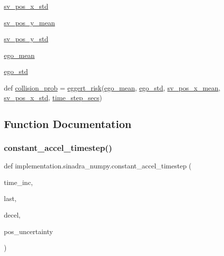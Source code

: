 \begin{DoxyCompactItemize}
\hyperlink{namespaceimplementation_1_1sinadra__numpy_af027725f7945a29278667e52ce882d34}{sv\+\_\+pos\+\_\+x\+\_\+std}
\item 
\hyperlink{namespaceimplementation_1_1sinadra__numpy_aa77bd0ac23bd72febb4ce46ac60752d7}{sv\+\_\+pos\+\_\+y\+\_\+mean}
\item 
\hyperlink{namespaceimplementation_1_1sinadra__numpy_aad9b3991770ec9b701a17aa44d5f27cb}{sv\+\_\+pos\+\_\+y\+\_\+std}
\item 
\hyperlink{namespaceimplementation_1_1sinadra__numpy_a03968fe07c6e67dc7cb0cca30fb4957f}{ego\+\_\+mean}
\item 
\hyperlink{namespaceimplementation_1_1sinadra__numpy_a9faba76b4cca2e2c06b3b5153cc34c62}{ego\+\_\+std}
\item 
def \hyperlink{namespaceimplementation_1_1sinadra__numpy_a9e18ed66f6c61c6adea2d1230d44cb9d}{collision\+\_\+prob} = \hyperlink{namespaceimplementation_1_1sinadra__numpy_a1b621325a54fc077f500c4fb8becb427}{eggert\+\_\+risk}(\hyperlink{namespaceimplementation_1_1sinadra__numpy_a03968fe07c6e67dc7cb0cca30fb4957f}{ego\+\_\+mean}, \hyperlink{namespaceimplementation_1_1sinadra__numpy_a9faba76b4cca2e2c06b3b5153cc34c62}{ego\+\_\+std}, \hyperlink{namespaceimplementation_1_1sinadra__numpy_a9e4d923a830ff18359b063c459ad086e}{sv\+\_\+pos\+\_\+x\+\_\+mean}, \hyperlink{namespaceimplementation_1_1sinadra__numpy_af027725f7945a29278667e52ce882d34}{sv\+\_\+pos\+\_\+x\+\_\+std}, \hyperlink{namespaceimplementation_1_1sinadra__numpy_a12dc648a1f889bc02c3353e9e40c449b}{time\+\_\+step\+\_\+secs})
\end{DoxyCompactItemize}


\subsection{Function Documentation}
\mbox{\label{namespaceimplementation_1_1sinadra__numpy_a091b3594c1bb34670cad99da45f69bb3}} 
\subsubsection{\texorpdfstring{constant\+\_\+accel\+\_\+timestep()}{constant\_accel\_timestep()}}
{\footnotesize\ttfamily def implementation.\+sinadra\+\_\+numpy.\+constant\+\_\+accel\+\_\+timestep (\begin{DoxyParamCaption}\item[{}]{time\+\_\+inc,  }\item[{}]{last,  }\item[{}]{decel,  }\item[{}]{pos\+\_\+uncertainty }\end{DoxyParamCaption})}

